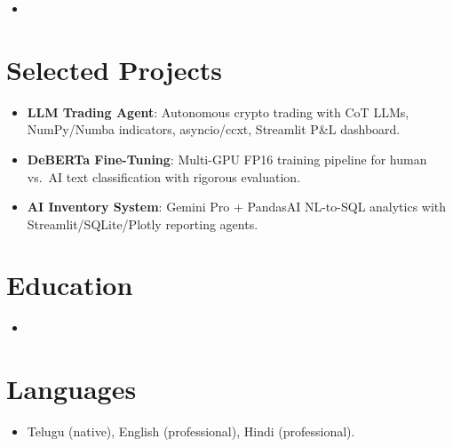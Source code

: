 \documentclass[11pt,a4paper,sans]{moderncv}
\begin{document}
\begin{itemize}
\vspace{3pt}

\item{}

\end{itemize}

\section{Selected Projects}
\vspace{1pt}
\begin{itemize}
\item \textbf{LLM Trading Agent}: Autonomous crypto trading with CoT LLMs, NumPy/Numba indicators, asyncio/ccxt, Streamlit P\&L dashboard.
\item \textbf{DeBERTa Fine-Tuning}: Multi-GPU FP16 training pipeline for human vs.\ AI text classification with rigorous evaluation.
\item \textbf{AI Inventory System}: Gemini Pro + PandasAI NL-to-SQL analytics with Streamlit/SQLite/Plotly reporting agents.
\end{itemize}

\section{Education}
\vspace{1pt}
\begin{itemize}
\item{}
\end{itemize}

\section{Languages}
\vspace{1pt}
\begin{itemize}
\item Telugu (native), English (professional), Hindi (professional).
\end{itemize}
\end{document}
